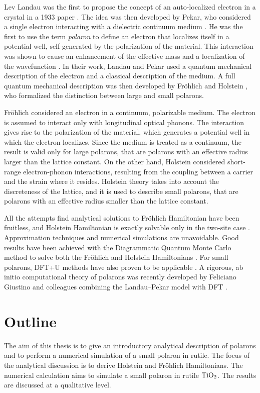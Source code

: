 Lev Landau was the first to propose the concept of an auto-localized electron in a crystal in a 1933 paper \cite{terhaar1965}. The idea was then developed by Pekar, who considered a single electron interacting with a dielectric continuum medium \cite{pekar1946, pekar1947}. He was the first to use the term \emph{polaron} to define an electron that localizes itself in a potential well, self-generated by the polarization of the material. This interaction was shown to cause an enhancement of the effective mass and a localization of the wavefunction \cite{landau1948}. In their work, Landau and Pekar used a quantum mechanical description of the electron and a classical description of the medium. A full quantum mechanical description was then developed by Fröhlich \cite{frohlich1950} and Holstein \cite{holstein1959}, who formalized the distinction between large and small polarons.

Fröhlich considered an electron in a continuum, polarizable medium. The electron is assumed to interact only with longitudinal optical phonons. The interaction gives rise to the polarization of the material, which generates a potential well in which the electron localizes. Since the medium is treated as a continuum, the result is valid only for large polarons, that are polarons with an effective radius larger than the lattice constant. On the other hand, Holstein considered short-range electron-phonon interactions, resulting from the coupling between a carrier and the strain where it resides. Holstein theory takes into account the discreteness of the lattice, and it is used to describe small polarons, that are polarons with an effective radius smaller than the lattice constant.

All the attempts find analytical solutions to Fröhlich Hamiltonian have been fruitless, and Holstein Hamiltonian is exactly solvable only in the two-site case \cite{rongsheng2002}. Approximation techniques and numerical simulations are unavoidable. Good results have been achieved with the Diagrammatic Quantum Monte Carlo method to solve both the Fröhlich and Holstein Hamiltonians \cite{prokofev1998,mishchenko2000}. For small polarons, DFT+U methods have also proven to be applicable \cite{kokott2018}. A rigo­rous, ab initio computational theory of polarons was recently developed by Feliciano Giustino and colleagues combining the Landau–Pekar model with DFT \cite{sio2019}.

\section*{Outline}
The aim of this thesis is to give an introductory analytical description of polarons and to perform a numerical simulation of a small polaron in rutile. The focus of the analytical discussion is to derive Holstein and Fröhlich Hamiltonians. The numerical calculation aims to simulate a small polaron in rutile $\ce{TiO_2}$. The results are discussed at a qualitative level.

